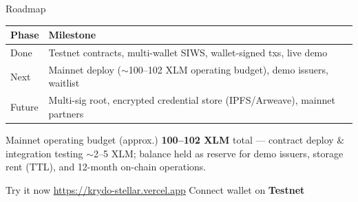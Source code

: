 \documentclass[aspectratio=169,11pt]{beamer}
\begin{document}
\begin{frame}{Roadmap}
  \begin{table}
    \small
    \renewcommand{\arraystretch}{1.3}
    \begin{tabularx}{\textwidth}{@{}l X@{}}
      \toprule
      \textbf{Phase} & \textbf{Milestone} \\
      \midrule
      Done & Testnet contracts, multi-wallet SIWS, wallet-signed txs, live demo \\
      Next & Mainnet deploy ($\sim$100--102 XLM operating budget), demo issuers, waitlist \\
      Future & Multi-sig root, encrypted credential store (IPFS/Arweave), mainnet partners \\
      \bottomrule
    \end{tabularx}
  \end{table}
  \vspace{0.4em}
  \begin{block}{Mainnet operating budget (approx.)}
    \textbf{100--102 XLM} total --- contract deploy \& integration testing $\sim$2--5 XLM;
    balance held as reserve for demo issuers, storage rent (TTL), and 12-month on-chain operations.
  \end{block}
  \vspace{0.3em}
  \begin{block}{Try it now}
    \url{https://krydo-stellar.vercel.app} \quad Connect wallet on \textbf{Testnet}
  \end{block}
\end{frame}

\begin{frame}[plain]
\end{frame}
\end{document}
